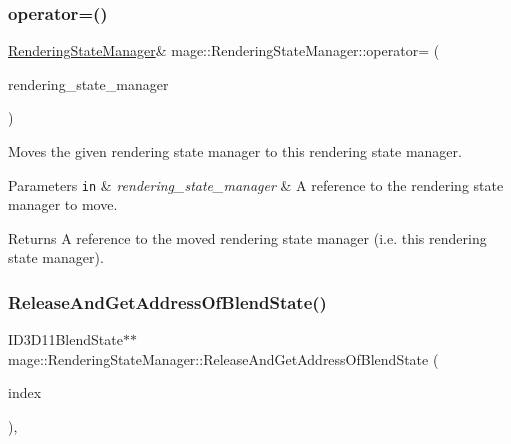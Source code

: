 \subsubsection{\texorpdfstring{operator=()}{operator=()}\hspace{0.1cm}{\footnotesize\ttfamily [2/2]}}
{\footnotesize\ttfamily \hyperlink{classmage_1_1_rendering_state_manager}{Rendering\+State\+Manager}\& mage\+::\+Rendering\+State\+Manager\+::operator= (\begin{DoxyParamCaption}\item[{\hyperlink{classmage_1_1_rendering_state_manager}{Rendering\+State\+Manager} \&\&}]{rendering\+\_\+state\+\_\+manager }\end{DoxyParamCaption})\hspace{0.3cm}{\ttfamily [delete]}}

Moves the given rendering state manager to this rendering state manager.


\begin{DoxyParams}[1]{Parameters}
\mbox{\tt in}  & {\em rendering\+\_\+state\+\_\+manager} & A reference to the rendering state manager to move. \\
\hline
\end{DoxyParams}
\begin{DoxyReturn}{Returns}
A reference to the moved rendering state manager (i.\+e. this rendering state manager). 
\end{DoxyReturn}
\hypertarget{classmage_1_1_rendering_state_manager_ad7626daab9a488a34ab50df3768d5bc9}{}\label{classmage_1_1_rendering_state_manager_ad7626daab9a488a34ab50df3768d5bc9} 
\subsubsection{\texorpdfstring{Release\+And\+Get\+Address\+Of\+Blend\+State()}{ReleaseAndGetAddressOfBlendState()}}
{\footnotesize\ttfamily I\+D3\+D11\+Blend\+State$\ast$$\ast$ mage\+::\+Rendering\+State\+Manager\+::\+Release\+And\+Get\+Address\+Of\+Blend\+State (\begin{DoxyParamCaption}\item[{\hyperlink{classmage_1_1_rendering_state_manager_ae8ea18eb352ae4cf9e23b41f10578984}{Blend\+State\+Index}}]{index }\end{DoxyParamCaption})\hspace{0.3cm}{\ttfamily [private]}, {\ttfamily [noexcept]}}

